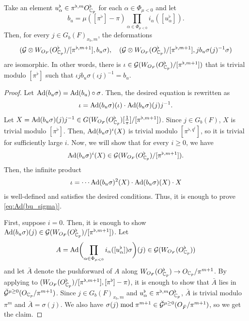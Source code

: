 \documentclass[12pt,reqno]{amsart}
\begin{document}
\begin{lem} \label{lem:isom_deformation_arbit}
    Take an element $u_\alpha^\flat \in \pi^{\flat, m} O_{\mathbb{C}_p}^\flat$ for each $\alpha \in \Phi_{\mu < 0}$ and let
    \[
        b_u = \mu([\pi^\flat] - \pi) \prod_{\alpha \in \Phi_{\mu < 0}} i_\alpha([u_\alpha^\flat]). 
    \]
    Then, for every $j \in G_b(F)_{x_b, m}$, the deformations
    \[
        ({\mathcal{G}} \otimes W_{O_F}(O_{\mathbb{C}_p}^\flat)/[\pi^{\flat ,m + 1}],b_u \sigma) ,\quad
        ({\mathcal{G}} \otimes W_{O_F}(O_{\mathbb{C}_p}^\flat)/[\pi^{\flat ,m + 1}], jb_u\sigma(j)^{-1} \sigma)
    \]
    are isomorphic. In other words, there is $\iota \in {\mathcal{G}}(W_{O_F}(O_{\mathbb{C}_p}^\flat)/[\pi^{\flat ,m + 1}])$ that is trivial modulo $[\pi^\flat]$ such that
    $
        \iota j b_u \sigma(\iota j)^{-1} = b_u. 
    $
\end{lem}
\begin{proof}
    Let ${\operatorname{Ad}}(b_u \sigma) = {\operatorname{Ad}}(b_u) \circ \sigma$. Then, the desired equation is rewritten as 
    \[
        \iota = {\operatorname{Ad}}(b_u\sigma)(\iota) \cdot {\operatorname{Ad}}(b_u \sigma)(j) j^{-1}. 
    \]
    Let $X = {\operatorname{Ad}}(b_u \sigma)(j) j^{-1} \in G(W_{O_F}(O_{\mathbb{C}_p}^\flat)[\tfrac{1}{\pi}]/[\pi^{\flat, m + 1}])$. Since $j \in G_b(F)$, $X$ is trivial modulo $[\pi^\flat]$. Then, ${\operatorname{Ad}}(b_u\sigma)^i(X)$ is trivial modulo $[\pi^{\flat, q^i}]$, so it is trivial for sufficiently large $i$. Now, we will show that for every $i \geq 0$, we have
    \begin{equation} \label{eq:Ad(bu_sigma)}
        {\operatorname{Ad}}(b_u\sigma)^i(X) \in {\mathcal{G}}(W_{O_F}(O_{\mathbb{C}_p}^\flat)/[\pi^{\flat, m + 1}]). 
    \end{equation}
    Then, the infinite product
    \[
        \iota = \cdots {\operatorname{Ad}}(b_u \sigma)^2(X) \cdot  {\operatorname{Ad}}(b_u \sigma)(X) \cdot X 
    \]
    is well-defined and satisfies the desired conditions. Thus, it is enough to prove \eqref{eq:Ad(bu_sigma)}. 

    First, suppose $i = 0$. Then, it is enough to show ${\operatorname{Ad}}(b_u \sigma)(j) \in {\mathcal{G}}(W_{O_F}(O_{\mathbb{C}_p}^\flat)/[\pi^{\flat, m + 1}])$. Let
    \[
        A = {\operatorname{Ad}}\biggl(\prod_{\alpha \in \Phi_{\mu < 0}} i_\alpha([u_\alpha^\flat]) \sigma\biggr)(j) \in {\mathcal{G}}(W_{O_F}(O_{\mathbb{C}_p}^\flat))
    \]
    and let $\bar{A}$ denote the pushforward of $A$ along $W_{O_F}(O_{\mathbb{C}_p}^\flat) \to O_{\mathbb{C}_p} / \pi^{m + 1}$. By applying \cite[Proposition 4.2.9]{Ito25a} to $(W_{O_F}(O_{\mathbb{C}_p}^\flat)/[\pi^{\flat, m + 1}], [\pi^\flat] - \pi)$, it is enough to show that $\bar{A}$ lies in ${\mathcal{\breve{G}}}^{\mu \geq 0}(O_{\mathbb{C}_p}/\pi^{m + 1})$. Since $j \in G_b(F)_{x_b, m}$ and $u_\alpha^\flat \in \pi^{\flat, m} O_{\mathbb{C}_p}^\flat$, $\bar{A}$ is trivial modulo $\pi^m$ and $\bar{A} = \sigma(j)$. We also have $\sigma(j) \bmod \pi^{m + 1} \in \breve{{\mathcal{G}}}^{\mu \geq 0}(O_{\breve{F}}/\pi^{m + 1})$, so we get the claim. 


\end{proof}
\end{document}
